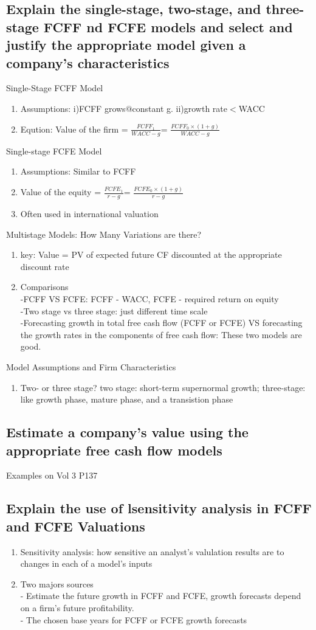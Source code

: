 \documentclass{article}
\newcommand{\be}{\begin{enumerate}}
\newcommand{\ee}{\end{enumerate}}
\begin{document}
\subsection{Explain the single-stage, two-stage, and three-stage FCFF nd FCFE models
and select and justify the appropriate model given a company's characteristics}
Single-Stage FCFF Model
\be
    \item Assumptions: i)FCFF grows$@$constant g. ii)growth rate$<$WACC
    \item Eqution: Value of the firm = $\frac{FCFF_1}{WACC-g}$=
        $\frac{FCFF_0\times (1+g)}{WACC-g}$
\ee
Single-stage FCFE Model
\be
    \item Assumptions: Similar to FCFF
    \item Value of the equity = $\frac{FCFE_1}{r-g}$=
        $\frac{FCFE_0\times (1+g)}{r-g}$
    \item Often used in international valuation
\ee
Multistage Models: How Many Variations are there?
\be
    \item key: Value = PV of expected future CF discounted at the appropriate discount rate
    \item Comparisons
        \\-FCFF VS FCFE: FCFF - WACC, FCFE - required return on equity
        \\-Two stage vs three stage: just different time scale
        \\-Forecasting growth in total free cash flow (FCFF or FCFE) VS forecasting
        the growth rates in the components of free cash flow: These two models are good.
\ee
Model Assumptions and Firm Characteristics
\be
    \item Two- or three stage? two stage: short-term supernormal growth; three-stage: like
        growth phase, mature phase, and a transistion phase
\ee
\subsection{Estimate a company's value using the appropriate free cash flow models}
Examples on Vol 3 P137
\subsection{Explain the use of lsensitivity analysis in FCFF and FCFE Valuations}
\be
    \item Sensitivity analysis: how sensitive an analyst's valulation results are to changes
        in each of a model's inputs
    \item Two majors sources
        \\- Estimate the future growth in FCFF and FCFE, growth forecasts depend on a firm's
        future profitability.
        \\- The chosen base years for FCFF or FCFE growth forecasts
\ee
\end{document}

